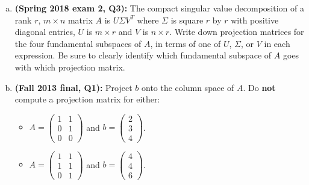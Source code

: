 \documentclass[11pt]{article}
\begin{document}
\begin{enumerate}[(a)]
\item \textbf{(Spring 2018 exam 2, Q3):} The compact singular value decomposition of a rank $r$, $m \times n$ matrix $A$ is $U\Sigma V^T$ where $\Sigma$ is square $r$ by $r$ with positive diagonal entries, $U$ is $m \times r$ and $V$ is $n \times r$. Write down projection matrices for the four fundamental subspaces of $A$, in terms of one of $U$, $\Sigma$, or $V$ in each expression. Be sure to clearly identify which fundamental subspace of $A$ goes with which projection matrix.
\item \textbf{(Fall 2013 final, Q1): } Project $b$ onto the column space of $A$. Do \textbf{not} compute a projection matrix for either:
\begin{itemize}
\item $A = \begin{pmatrix} 1 & 1 \\ 0 & 1 \\ 0 & 0 \end{pmatrix}$ and $b = \begin{pmatrix} 2 \\ 3 \\ 4 \end{pmatrix}$.
\item $A = \begin{pmatrix} 1 & 1 \\ 1 & 1 \\ 0 & 1  \end{pmatrix}$ and $b = \begin{pmatrix} 4 \\ 4 \\ 6 \end{pmatrix}$.
\end{itemize}
\end{enumerate}

\newpage

\end{document}
